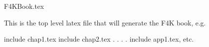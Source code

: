 F4KBook.tex

This is the top level latex file that will generate the F4K book, e.g. 

include chap1.tex
include chap2.tex
.
.
.
.
include app1.tex, etc.

